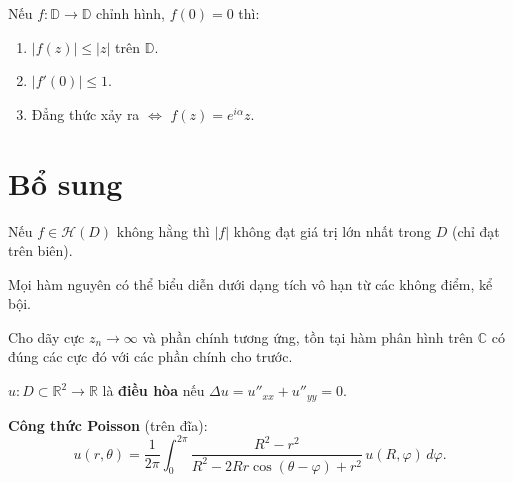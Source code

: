 \documentclass[12pt,a4paper]{article}
\begin{document}
\begin{dinhly}[title={Bổ đề Schwarz}]
  Nếu $f: \mathbb{D} \to \mathbb{D}$ chỉnh hình, $f(0) = 0$ thì:
  \begin{enumerate}
    \item $|f(z)| \le |z|$ trên $\mathbb{D}$.
    \item $|f'(0)| \le 1$.
    \item Đẳng thức xảy ra $\Leftrightarrow$ $f(z) = e^{i\alpha} z$.
  \end{enumerate}
\end{dinhly}

\section{Bổ sung}

\begin{dinhly}[title={Nguyên lý giá trị lớn nhất}]
  Nếu $f \in \mathcal{H}(D)$ không hằng thì $|f|$ không đạt giá trị lớn nhất trong $D$ (chỉ đạt trên biên).
\end{dinhly}

\begin{dinhly}[title={Định lý Weierstrass (nhân tử)}]
  Mọi hàm nguyên có thể biểu diễn dưới dạng tích vô hạn từ các không điểm, kể bội.
\end{dinhly}

\begin{dinhly}[title={Định lý Mittag-Leffler}]
  Cho dãy cực $z_n \to \infty$ và phần chính tương ứng, tồn tại hàm phân hình trên $\mathbb{C}$ có đúng các cực đó với các phần chính cho trước.
\end{dinhly}

\begin{dinhnghia}[title={Hàm điều hòa}]
  $u: D \subset \mathbb{R}^2 \to \mathbb{R}$ là \textbf{điều hòa} nếu $\Delta u = u''_{xx} + u''_{yy} = 0$.

  \textbf{Công thức Poisson} (trên đĩa):
  \[
    u(r, \theta) = \frac{1}{2\pi}\int_0^{2\pi} \frac{R^2 - r^2}{R^2 - 2Rr\cos(\theta - \varphi) + r^2}\,u(R, \varphi)\,d\varphi.
  \]
\end{dinhnghia}
\end{document}
